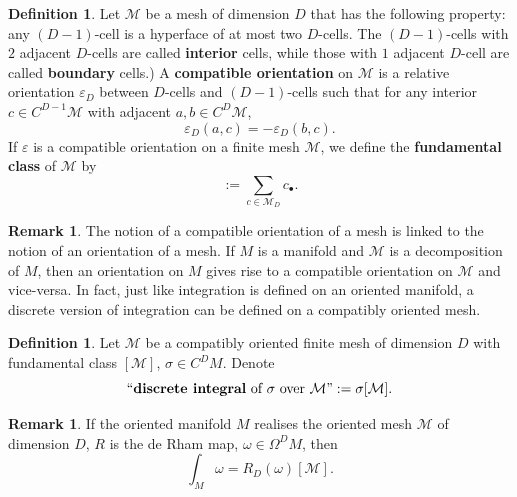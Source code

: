 \documentclass{elsarticle}
\theoremstyle{definition}
\newtheorem{definition}[theorem]{Definition}
\newtheorem{remark}[theorem]{Remark}
\newcommand{\newterm}[1]{\textbf{#1}}
\begin{document}
\begin{definition}
  Let $\mathcal{M}$ be a mesh of dimension $D$
  that has the following property: any $(D - 1)$-cell is a hyperface of at most two $D$-cells. The $(D - 1)$-cells with $2$ adjacent $D$-cells are called \newterm{interior} cells, while those with $1$ adjacent $D$-cell are called \newterm{boundary} cells.)
  A \newterm{compatible orientation} on $\mathcal{M}$ is a relative orientation $\varepsilon_D$ between $D$-cells and $(D - 1)$-cells such that for any interior $c \in C^{D - 1} \mathcal{M}$ with adjacent $a, b \in C^D \mathcal{M}$,
  \begin{equation}
    \varepsilon_D(a, c) = - \varepsilon_D(b, c).
  \end{equation}
  If $\varepsilon$ is a compatible orientation on a finite mesh $\mathcal{M}$,
  we define the \newterm{fundamental class} of $\mathcal{M}$ by
  \begin{equation}
    [\mathcal{M}] := \sum_{c \in \mathcal{M}_D} c_\bullet.
  \end{equation}
\end{definition}
\begin{remark}
  The notion of a compatible orientation of a mesh is linked to the notion of an orientation of a mesh.
  If $M$ is a manifold and $\mathcal{M}$ is a decomposition of $M$, then an orientation on $M$ gives rise to a compatible orientation on $\mathcal{M}$ and vice-versa.
  In fact, just like integration is defined on an oriented manifold, a discrete version of integration can be defined on a compatibly oriented mesh.
\end{remark}
\begin{definition}
  Let $\mathcal{M}$ be a compatibly oriented finite mesh of dimension $D$ with fundamental class $[\mathcal{M}]$,
  $\sigma \in C^D M$.
  Denote
  \begin{equation}
    \text{``\newterm{discrete integral} of $\sigma$ over $\mathcal{M}$''} := \sigma [\mathcal{M}].
  \end{equation}
\end{definition}
\begin{remark}
  If the oriented manifold $M$ realises the oriented mesh $\mathcal{M}$ of dimension $D$,
  $R$ is the de Rham map, $\omega \in \Omega^D M$, then
  \begin{equation}
    \int_M \omega = R_D(\omega)[\mathcal{M}].
  \end{equation}
\end{remark}
\end{document}
